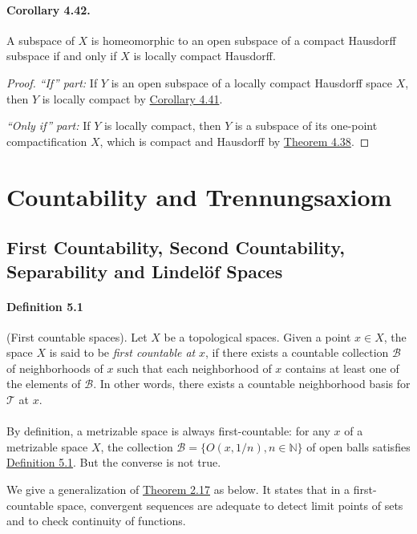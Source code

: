 \documentclass{article}
\numberwithin{equation}{section}
\theoremstyle{plain}
\theoremstyle{definition}
\begin{document}
\paragraph{Corollary 4.42.\label{cor:4.42}} A subspace of $X$ is homeomorphic to an open subspace of a compact Hausdorff subspace if and only if $X$ is locally compact Hausdorff.
\begin{proof}
\textit{``If'' part:} If $Y$ is an open subspace of a locally compact Hausdorff space $X$, then $Y$ is locally compact by \hyperref[cor:4.41]{Corollary 4.41}.

\textit{``Only if'' part:} If $Y$ is locally compact, then $Y$ is a subspace of its one-point compactification $X$, which is compact and Hausdorff by \hyperref[thm:4.38]{Theorem 4.38}.
\end{proof}

\newpage
\section{Countability and Trennungsaxiom}
\subsection{First Countability, Second Countability, Separability and Lindelöf Spaces}
\paragraph{Definition 5.1\label{def:5.1}} (First countable spaces). Let $X$ be a topological spaces. Given a point $x\in X$, the space $X$ is said to be \textit{first countable at} $x$, if there exists a countable collection $\mathscr{B}$ of neighborhoods of $x$ such that each neighborhood of $x$ contains at least one of the elements of $\mathscr{B}$. In other words, there exists a countable neighborhood basis for $\mathscr{T}$ at $x$.

\paragraph{} By definition, a metrizable space is always first-countable: for any $x$ of a metrizable space $X$, the collection $\mathscr{B}=\{O(x,1/n),n\in\mathbb{N}\}$ of open balls satisfies \hyperref[def:5.1]{Definition 5.1}. But the converse is not true.

We give a generalization of \hyperref[thm:2.17]{Theorem 2.17} as below. It states that in a first-countable space, convergent sequences are adequate to detect limit points of sets and to
check continuity of functions.
\end{document}
